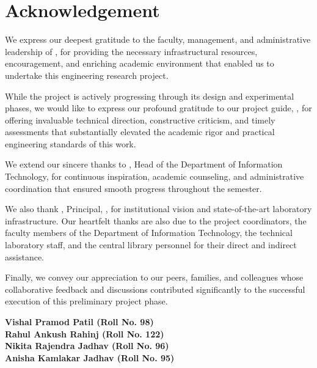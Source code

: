 \clearpage
{}
\setcounter{page}{1}
\thispagestyle{plain}
\chapter*{Acknowledgement}

We express our deepest gratitude to the faculty, management, and administrative leadership of \textbf{\college}, for providing the necessary infrastructural resources, encouragement, and enriching academic environment that enabled us to undertake this engineering research project.

While the project is actively progressing through its design and experimental phases, we would like to express our profound gratitude to our project guide, \textbf{\guide}, for offering invaluable technical direction, constructive criticism, and timely assessments that substantially elevated the academic rigor and practical engineering standards of this work.

We extend our sincere thanks to \textbf{\hod}, Head of the Department of Information Technology, for continuous inspiration, academic counseling, and administrative coordination that ensured smooth progress throughout the semester.

We also thank \textbf{\principal}, Principal, \college, for institutional vision and state-of-the-art laboratory infrastructure. Our heartfelt thanks are also due to the project coordinators, the faculty members of the Department of Information Technology, the technical laboratory staff, and the central library personnel for their direct and indirect assistance.

Finally, we convey our appreciation to our peers, families, and colleagues whose collaborative feedback and discussions contributed significantly to the successful execution of this preliminary project phase.

\vspace{0.35in}
\begin{flushright}
\textbf{Vishal Pramod Patil (Roll No. 98)}\\
\textbf{Rahul Ankush Rahinj (Roll No. 122)}\\
\textbf{Nikita Rajendra Jadhav (Roll No. 96)}\\
\textbf{Anisha Kamlakar Jadhav (Roll No. 95)}
\end{flushright}
\clearpage
